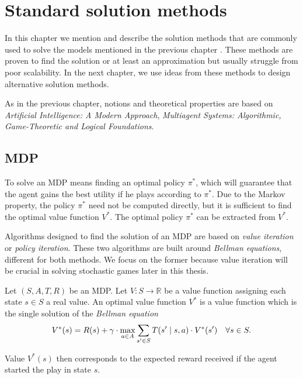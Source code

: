 \documentclass[../main.tex]{subfiles}
\begin{document}
\chapter{Standard solution methods}\label{standard}
In this chapter we mention and describe the solution methods that are commonly used to solve the models mentioned in the previous chapter .
These methods are proven to find the solution or at least an approximation but usually struggle from poor scalability.
In the next chapter, we use ideas from these methods to design alternative solution methods.

As in the previous chapter, notions and theoretical properties are based on \textit{Artificial Intelligence: A Modern Approach}\cite{aima}, \textit{Multiagent Systems: Algorithmic, Game-Theoretic and Logical Foundations}\cite{multiagent}.

\section{MDP}\label{standard:mdp}
To solve an MDP means finding an optimal policy $\pi^*$, which will guarantee that the agent gains the best utility if he plays according to $\pi^*$.
Due to the Markov property, the policy $\pi^*$ need not be computed directly, but it is sufficient to find the optimal value function $V^*$.
The optimal policy $\pi^*$ can be extracted from $V^*$.

Algorithms designed to find the solution of an MDP are based on \textit{value iteration} or \textit{policy iteration}.
These two algorithms are built around \textit{Bellman equations}, different for both methods.
We focus on the former because value iteration will be crucial in solving stochastic games later in this thesis.

\begin{theorem}\label{standard:mdp:bellmaneq}
    Let $\left(S, A, T, R\right)$ be an MDP.
    Let $V: S \to \mathbb{R}$ be a value function assigning each state $s \in S$ a real value.
    An optimal value function $V^{*}$ is a value function which is the single solution of the \textit{Bellman equation}
    \begin{equation}
        V^{*}(s) = R(s) + \gamma \cdot \max_{a \in A} \sum_{s^{\prime} \in S} T(s^{\prime} \mid s, a) \cdot V^{*}(s^{\prime}) \quad \forall s \in S.
    \end{equation}
\end{theorem}
Value $V^{*}(s)$ then corresponds to the expected reward received if the agent started the play in state $s$.
\end{document}
